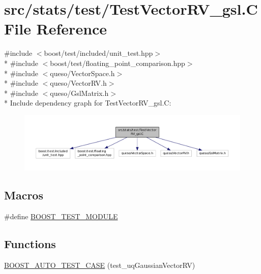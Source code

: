 \hypertarget{_test_vector_r_v__gsl_8_c}{\section{src/stats/test/\-Test\-Vector\-R\-V\-\_\-gsl.C File Reference}
\label{_test_vector_r_v__gsl_8_c}
}
{\ttfamily \#include $<$boost/test/included/unit\-\_\-test.\-hpp$>$}\\*
{\ttfamily \#include $<$boost/test/floating\-\_\-point\-\_\-comparison.\-hpp$>$}\\*
{\ttfamily \#include $<$queso/\-Vector\-Space.\-h$>$}\\*
{\ttfamily \#include $<$queso/\-Vector\-R\-V.\-h$>$}\\*
{\ttfamily \#include $<$queso/\-Gsl\-Matrix.\-h$>$}\\*
Include dependency graph for Test\-Vector\-R\-V\-\_\-gsl.\-C\-:
\nopagebreak
\begin{figure}[H]
\begin{center}
\leavevmode
\includegraphics[width=350pt]{_test_vector_r_v__gsl_8_c__incl}
\end{center}
\end{figure}
\subsection*{Macros}
\begin{DoxyCompactItemize}
\item 
\#define \hyperlink{_test_vector_r_v__gsl_8_c_a6b2a3852db8bb19ab6909bac01859985}{B\-O\-O\-S\-T\-\_\-\-T\-E\-S\-T\-\_\-\-M\-O\-D\-U\-L\-E}
\end{DoxyCompactItemize}
\subsection*{Functions}
\begin{DoxyCompactItemize}
\item 
\hyperlink{_test_vector_r_v__gsl_8_c_a5650170fa8d54a55ef8037da7d76b4c2}{B\-O\-O\-S\-T\-\_\-\-A\-U\-T\-O\-\_\-\-T\-E\-S\-T\-\_\-\-C\-A\-S\-E} (test\-\_\-uq\-Gaussian\-Vector\-R\-V)
\end{DoxyCompactItemize}


